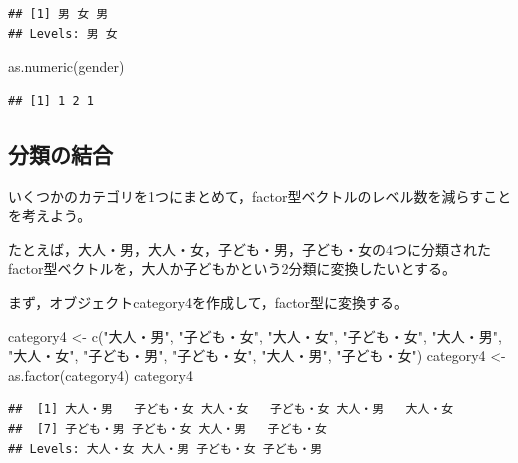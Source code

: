 \documentclass[
]{book}
\newenvironment{Shaded}{\begin{snugshade}}{\end{snugshade}}
\newcommand{\FunctionTok}[1]{\textcolor[rgb]{0.00,0.00,0.00}{#1}}
\newcommand{\NormalTok}[1]{#1}
\newcommand{\OtherTok}[1]{\textcolor[rgb]{0.56,0.35,0.01}{#1}}
\newcommand{\StringTok}[1]{\textcolor[rgb]{0.31,0.60,0.02}{#1}}
\begin{document}
\begin{verbatim}
## [1] 男 女 男
## Levels: 男 女
\end{verbatim}

\begin{Shaded}
\begin{Highlighting}[]
\FunctionTok{as.numeric}\NormalTok{(gender)}
\end{Highlighting}
\end{Shaded}

\begin{verbatim}
## [1] 1 2 1
\end{verbatim}

\hypertarget{ux5206ux985eux306eux7d50ux5408}{%
\subsection{分類の結合}\label{ux5206ux985eux306eux7d50ux5408}}

いくつかのカテゴリを1つにまとめて，factor型ベクトルのレベル数を減らすことを考えよう。

たとえば，大人・男，大人・女，子ども・男，子ども・女の4つに分類されたfactor型ベクトルを，大人か子どもかという2分類に変換したいとする。

まず，オブジェクトcategory4を作成して，factor型に変換する。

\begin{Shaded}
\begin{Highlighting}[]
\NormalTok{category4 }\OtherTok{\textless{}{-}} \FunctionTok{c}\NormalTok{(}\StringTok{"大人・男"}\NormalTok{,}
              \StringTok{"子ども・女"}\NormalTok{,}
              \StringTok{"大人・女"}\NormalTok{,}
              \StringTok{"子ども・女"}\NormalTok{,}
              \StringTok{"大人・男"}\NormalTok{,}
              \StringTok{"大人・女"}\NormalTok{,}
              \StringTok{"子ども・男"}\NormalTok{,}
              \StringTok{"子ども・女"}\NormalTok{,}
              \StringTok{"大人・男"}\NormalTok{,}
              \StringTok{"子ども・女"}\NormalTok{)}
\NormalTok{category4 }\OtherTok{\textless{}{-}} \FunctionTok{as.factor}\NormalTok{(category4)}
\NormalTok{category4}
\end{Highlighting}
\end{Shaded}

\begin{verbatim}
##  [1] 大人・男   子ども・女 大人・女   子ども・女 大人・男   大人・女  
##  [7] 子ども・男 子ども・女 大人・男   子ども・女
## Levels: 大人・女 大人・男 子ども・女 子ども・男
\end{verbatim}
\end{document}
